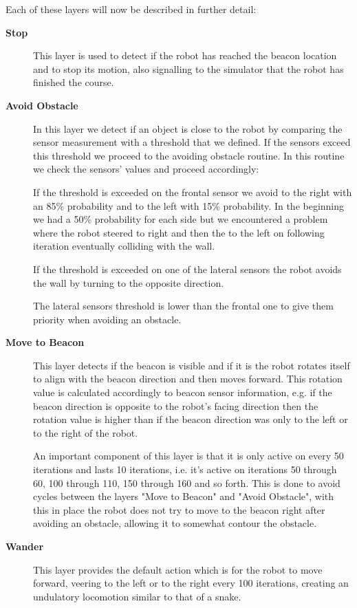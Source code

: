 \documentclass[oribibl]{llncs}
\begin{document}
Each of these layers will now be described in further detail:
\begin{description}
  \item[\textbf{Stop}]
  This layer is used to detect if the robot has reached the beacon location and to stop its motion, also signalling to the simulator that the robot has finished the course.
  \item[\textbf{Avoid Obstacle}]
  In this layer we detect if an object is close to the robot by comparing the sensor measurement with a threshold that we defined. If the sensors exceed this threshold we proceed to the avoiding obstacle routine. In this routine we check the sensors' values and proceed accordingly: 
  
  If the threshold is exceeded on the frontal sensor we avoid to the right with an 85\% probability and to the left with 15\% probability. In the beginning we had a 50\% probability for each side but we encountered a problem where the robot steered to right and then the to the left on following iteration eventually colliding with the wall.
  
  If the threshold is exceeded on one of the lateral sensors the robot avoids the wall by turning to the opposite direction.
  
  The lateral sensors threshold is lower than the frontal one to give them priority when avoiding an obstacle.
  \item[\textbf{Move to Beacon}]
  This layer detects if the beacon is visible and if it is the robot rotates itself to align with the beacon direction and then moves forward. This rotation value is calculated accordingly to beacon sensor information, e.g. if the beacon direction is opposite to the robot's facing direction then the rotation value is higher than if the beacon direction was only to the left or to the right of the robot.
  
  An important component of this layer is that it is only active on every 50 iterations and lasts 10 iterations, i.e. it's active on iterations 50 through 60, 100 through 110, 150 through 160 and so forth. This is done to avoid cycles between the layers "Move to Beacon" and "Avoid Obstacle", with this in place the robot does not try to move to the beacon right after avoiding an obstacle, allowing it to somewhat contour the obstacle.
  \item[\textbf{Wander}]
  This layer provides the default action which is for the robot to move forward, veering to the left or to the right every 100 iterations, creating an undulatory locomotion similar to that of a snake.
\end{description}
\end{document}

